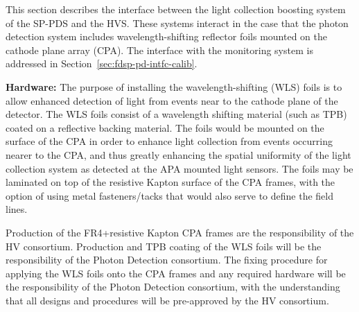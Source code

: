 

This section describes the interface between the light collection boosting system of the SP-PDS  and the HVS. These systems interact in the case that the photon detection system includes wavelength-shifting reflector foils mounted on the cathode plane array (CPA). The interface with the monitoring system is addressed in Section~\ref{sec:fdsp-pd-intfc-calib}.

\textbf{Hardware: }The purpose of installing the wavelength-shifting (WLS) foils is to allow enhanced detection of light from events near to the cathode plane of the detector. The WLS foils consist of a wavelength shifting material (such as TPB) coated on a reflective backing material. The foils would be mounted on the surface of the CPA in order to enhance light collection from events occurring nearer to the CPA, and thus greatly enhancing the spatial uniformity of the light collection system as detected at the APA mounted light sensors. The foils may be laminated on top of the resistive Kapton surface of the CPA frames, with the option of using metal fasteners/tacks that would also serve to define the field lines. 

Production of the FR4+resistive Kapton CPA frames are the responsibility of the HV consortium. Production and TPB coating of the WLS foils will be the responsibility of the Photon Detection consortium. The fixing procedure for applying the WLS foils onto the CPA frames and any required hardware will be the responsibility of the Photon Detection consortium, with the understanding that all designs and procedures will be pre-approved by the HV consortium. 

